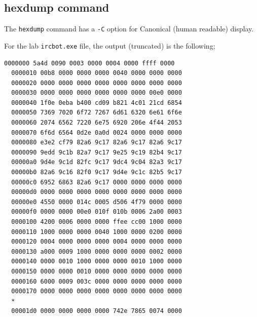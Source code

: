 \documentclass[]{project_plan}
\begin{document}
\subsection{hexdump command}

The \lstinline|hexdump| command has a \lstinline|-C| option for Canonical (human readable) display.

For the lab
\lstinline|ircbot.exe| file, the output (truncated) is the following;
\begin{lstlisting}[basicstyle=\tiny]
  0000000 5a4d 0090 0003 0000 0004 0000 ffff 0000
  0000010 00b8 0000 0000 0000 0040 0000 0000 0000
  0000020 0000 0000 0000 0000 0000 0000 0000 0000
  0000030 0000 0000 0000 0000 0000 0000 00e0 0000
  0000040 1f0e 0eba b400 cd09 b821 4c01 21cd 6854
  0000050 7369 7020 6f72 7267 6d61 6320 6e61 6f6e
  0000060 2074 6562 7220 6e75 6920 206e 4f44 2053
  0000070 6f6d 6564 0d2e 0a0d 0024 0000 0000 0000
  0000080 e3e2 cf79 82a6 9c17 82a6 9c17 82a6 9c17
  0000090 9edd 9c1b 82a7 9c17 9e25 9c19 82b4 9c17
  00000a0 9d4e 9c1d 82fc 9c17 9dc4 9c04 82a3 9c17
  00000b0 82a6 9c16 82f0 9c17 9d4e 9c1c 82b5 9c17
  00000c0 6952 6863 82a6 9c17 0000 0000 0000 0000
  00000d0 0000 0000 0000 0000 0000 0000 0000 0000
  00000e0 4550 0000 014c 0005 d506 4f79 0000 0000
  00000f0 0000 0000 00e0 010f 010b 0006 2a00 0003
  0000100 4200 0006 0000 0000 ffee cc00 1000 0000
  0000110 1000 0000 0000 0040 1000 0000 0200 0000
  0000120 0004 0000 0000 0000 0004 0000 0000 0000
  0000130 a000 0009 1000 0000 0000 0000 0002 0000
  0000140 0000 0010 1000 0000 0000 0010 1000 0000
  0000150 0000 0000 0010 0000 0000 0000 0000 0000
  0000160 6000 0009 003c 0000 0000 0000 0000 0000
  0000170 0000 0000 0000 0000 0000 0000 0000 0000
  *
  00001d0 0000 0000 0000 0000 742e 7865 0074 0000
\end{lstlisting}
\end{document}
